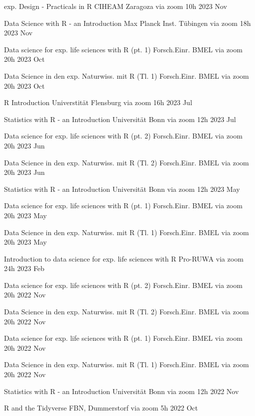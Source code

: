 \documentclass[11pt,a4paper,]{awesome-cv}
\begin{document}
\begin{cvhonors}
\cvhonor
{exp. Design - Practicals in R  }
{CIHEAM Zaragoza via zoom}
{10h}
{2023 Nov  }

\cvhonor
{Data Science with R - an Introduction  }
{Max Planck Inst. Tübingen via zoom}
{18h}
{2023 Nov  }

\cvhonor
{Data science for exp. life sciences with R (pt. 1)  }
{Forsch.Einr. BMEL via zoom}
{20h}
{2023 Oct  }

\cvhonor
{Data Science in den exp. Naturwiss. mit R (Tl. 1)  }
{Forsch.Einr. BMEL via zoom}
{20h}
{2023 Oct  }

\cvhonor
{R Introduction  }
{Universtität Flensburg via zoom}
{16h}
{2023 Jul  }

\cvhonor
{Statistics with R - an Introduction  }
{Universität Bonn via zoom}
{12h}
{2023 Jul  }

\cvhonor
{Data science for exp. life sciences with R (pt. 2)  }
{Forsch.Einr. BMEL via zoom}
{20h}
{2023 Jun  }

\cvhonor
{Data Science in den exp. Naturwiss. mit R (Tl. 2)  }
{Forsch.Einr. BMEL via zoom}
{20h}
{2023 Jun  }

\cvhonor
{Statistics with R - an Introduction  }
{Universität Bonn via zoom}
{12h}
{2023 May  }

\cvhonor
{Data science for exp. life sciences with R (pt. 1)  }
{Forsch.Einr. BMEL via zoom}
{20h}
{2023 May  }

\cvhonor
{Data Science in den exp. Naturwiss. mit R (Tl. 1)  }
{Forsch.Einr. BMEL via zoom}
{20h}
{2023 May  }

\cvhonor
{Introduction to data science for exp. life sciences with R  }
{Pro-RUWA via zoom}
{24h}
{2023 Feb  }

\cvhonor
{Data science for exp. life sciences with R (pt. 2)  }
{Forsch.Einr. BMEL via zoom}
{20h}
{2022 Nov  }

\cvhonor
{Data Science in den exp. Naturwiss. mit R (Tl. 2)  }
{Forsch.Einr. BMEL via zoom}
{20h}
{2022 Nov  }

\cvhonor
{Data science for exp. life sciences with R (pt. 1)  }
{Forsch.Einr. BMEL via zoom}
{20h}
{2022 Nov  }

\cvhonor
{Data Science in den exp. Naturwiss. mit R (Tl. 1)  }
{Forsch.Einr. BMEL via zoom}
{20h}
{2022 Nov  }

\cvhonor
{Statistics with R - an Introduction  }
{Universität Bonn via zoom}
{12h}
{2022 Nov  }

\cvhonor
{R and the {Tidyverse}  }
{FBN, Dummerstorf via zoom}
{5h}
{2022 Oct  }


\end{cvhonors}
\end{document}
